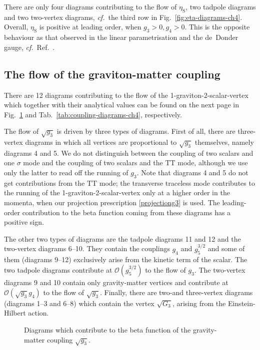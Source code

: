 \documentclass[11pt]{book}
\newcommand\etaS{ \eta_{\scriptscriptstyle{\mathrm{S}}} }
\newcommand\cf{\textit{cf.}\ }
\numberwithin{equation}{chapter}
\begin{document}
There are only four diagrams contributing to the flow of $\etaS$, two tadpole diagrams and two two-vertex diagrams,
\cf the third row in Fig.~\ref{fig:eta-diagrams-ch4}.
Overall, $\etaS$ is positive at leading order, when $g_3>0, g_4>0$.
This is the opposite behaviour as that observed in the linear parametrisation
and the de~Donder gauge, \cf Ref.~\cite{Dona:2013qba}.


\subsection{The flow of the graviton-matter coupling}

There are 12 diagrams contributing to the
flow of the 1-graviton-2-scalar-vertex
which together with their analytical values can be found on
the next page
in Fig.~\ref{fig:coupling-diagrams-ch4} and Tab.~\ref{tab:coupling-diagrams-ch4},
respectively.


The flow of $\sqrt{g_3}$ is driven by three types of diagrams.
First of all, there are three-vertex diagrams in which all
vertices are proportional to $\sqrt{g_3}$ themselves,
namely diagrams 4 and 5.
We do not distinguish between the coupling of two
scalars and one $\sigma$ mode and the coupling of two scalars and
the $\mathrm{TT}$ mode,
although we use only the latter to read off the running of $g_3$.
Note that diagrams 4 and 5 do not get contributions from the $\mathrm{TT}$ mode;
the transverse traceless mode contributes to the running of the
1-graviton-2-scalar-vertex only at a higher order in the momenta,
when our projection prescription \eqref{projectiong3} is used.
The leading-order contribution to the beta function coming from
these diagrams has a positive sign.

The other two types of diagrams are the tadpole diagrams 11 and 12
and the two-vertex diagrams 6--10.
They contain the couplings $g_4$ and $g_5^{3/2}$ and
some of them (diagrams 9--12) exclusively arise from the kinetic term of the scalar.
The two tadpole diagrams contribute at $\mathcal{O}(g_5^{3/2})$ to the flow of $g_3$.
The two-vertex diagrams 9 and 10 contain only gravity-matter vertices and contribute
at $\mathcal{O}(\sqrt{g_3} g_4)$ to the flow of $\sqrt{g_3}$.
Finally, there are two-and three-vertex diagrams (diagrams 1--3 and 6--8)
which contain the vertex $\sqrt{G_3}$, arising from the Einstein-Hilbert action.

\begin{figure}[p]
  \begin{center}
    
  \end{center}
  \caption{
    Diagrams which contribute to the beta function of the gravity-matter coupling
    $\sqrt{g_3}$.
  }
  \label{fig:coupling-diagrams-ch4}
\end{figure}
\end{document}
